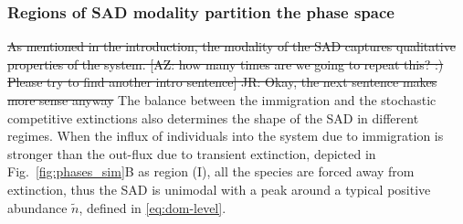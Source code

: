 \documentclass[9pt,twocolumn,twoside,lineno]{pnas-new}
\begin{document}
\subsubsection{Regions of SAD modality partition the phase space}
\st{As mentioned in the introduction, the modality of the SAD captures qualitative properties of the system. [AZ: how many times are we going to repeat this? :) Please try to find another intro sentence] JR: Okay, the next sentence makes more sense anyway}
%
%
The balance between the immigration and the stochastic competitive extinctions also determines the shape of the SAD in different regimes. 
When the influx of individuals into the system due to immigration is stronger than the out-flux due to transient extinction, depicted in Fig.~\ref{fig:phases_sim}B as region (I), all the species are forced away from extinction, thus the SAD is unimodal with a peak around a typical positive abundance $\tilde{n}$, defined in \eqref{eq:dom-level}.
\end{document}
